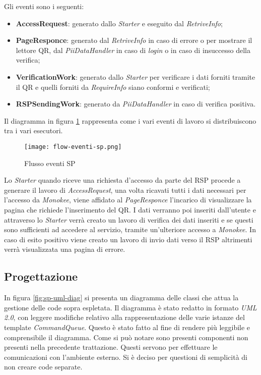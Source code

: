 Gli eventi sono i seguenti:
\begin{itemize}
    \item \textbf{AccessRequest}: generato dallo \emph{Starter} e eseguito dal \emph{RetriveInfo};
    \item \textbf{PageResponce}: generato dal \emph{RetriveInfo} in caso di errore o per mostrare il lettore QR, dal \emph{PiiDataHandler} in caso di \emph{login} o in caso di insuccesso della verifica;
    \item \textbf{VerificationWork}: generato dallo \emph{Starter} per verificare i dati forniti tramite il QR e quelli forniti da \emph{RequireInfo} siano conformi e verificati; 
    \item \textbf{RSPSendingWork}: generato da \emph{PiiDataHandler} in caso di verifica positiva.
\end{itemize}
    
 Il diagramma in figura \ref{fig:eventdriven-flusso-code} rappresenta come i vari eventi di lavoro si distribuiscono tra i vari esecutori.

 \begin{figure}[!h]
    \centering
    \texttt{[image: flow-eventi-sp.png]} 
    \caption{Flusso eventi SP}
    \label{fig:eventdriven-flusso-code} 
\end{figure}
Lo \emph{Starter} quando riceve una richiesta d’accesso da parte del RSP procede a generare il lavoro di \emph{AccessRequest}, una volta ricavati tutti i dati necessari per l’accesso da \emph{Monokee}, viene affidato al \emph{PageResponce} l’incarico di visualizzare la pagina che richiede l’inserimento del QR. I dati verranno poi inseriti dall’utente e attraverso lo \emph{Starter} verrà creato un lavoro di verifica dei dati inseriti e se questi sono sufficienti ad accedere al servizio, tramite un’ulteriore accesso a \emph{Monokee}. In caso di esito positivo viene creato un lavoro di invio dati verso il RSP altrimenti verrà visualizzata una pagina di errore.

\newpage
\subsection{Progettazione}
\label{sec:progettazione}
In figura \ref{fig:sp-uml-diag} si presenta un diagramma delle classi che attua la gestione delle code sopra espletata. Il diagramma è stato redatto in formato \emph{UML 2.0}, con leggere modifiche relativo alla rappresentazione delle varie istanze del template \emph{CommandQueue}. Questo è stato fatto al fine di rendere più leggibile e comprensibile il diagramma. Come si può notare sono presenti componenti non presenti nella precedente trattazione. Questi servono per effettuare le comunicazioni con l’ambiente esterno. Si è deciso per questioni di semplicità di non creare code separate.

